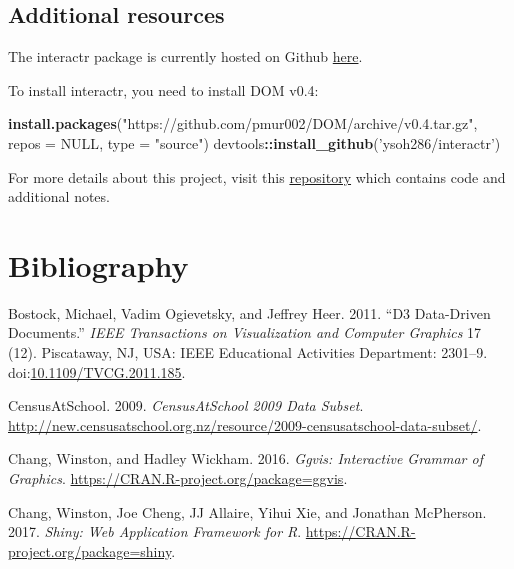 \documentclass[11pt,]{report}
\newenvironment{Shaded}{\begin{snugshade}}{\end{snugshade}}
\newcommand{\KeywordTok}[1]{\textcolor[rgb]{0.13,0.29,0.53}{\textbf{#1}}}
\newcommand{\DataTypeTok}[1]{\textcolor[rgb]{0.13,0.29,0.53}{#1}}
\newcommand{\StringTok}[1]{\textcolor[rgb]{0.31,0.60,0.02}{#1}}
\newcommand{\OtherTok}[1]{\textcolor[rgb]{0.56,0.35,0.01}{#1}}
\newcommand{\OperatorTok}[1]{\textcolor[rgb]{0.81,0.36,0.00}{\textbf{#1}}}
\newcommand{\NormalTok}[1]{#1}
\begin{document}
\section{Additional resources}\label{additional-resources}

The \textsf{interactr} package is currently hosted on Github
\href{https://github.com/ysoh286/interactr}{here}.

To install \textsf{interactr}, you need to install DOM v0.4:

\begin{Shaded}
\begin{Highlighting}[]
\KeywordTok{install.packages}\NormalTok{(}\StringTok{"https://github.com/pmur002/DOM/archive/v0.4.tar.gz"}\NormalTok{,}
                \DataTypeTok{repos =} \OtherTok{NULL}\NormalTok{, }\DataTypeTok{type =} \StringTok{"source"}\NormalTok{)}
\NormalTok{devtools}\OperatorTok{::}\KeywordTok{install_github}\NormalTok{(}\StringTok{'ysoh286/interactr'}\NormalTok{)}
\end{Highlighting}
\end{Shaded}

For more details about this project, visit this
\href{https://github.com/ysoh286/honours-project-2017}{repository} which
contains code and additional notes.

\newpage

\chapter*{Bibliography}\label{bibliography}

\hypertarget{refs}{}
\hypertarget{ref-bostock01}{}
Bostock, Michael, Vadim Ogievetsky, and Jeffrey Heer. 2011. ``D3
Data-Driven Documents.'' \emph{IEEE Transactions on Visualization and
Computer Graphics} 17 (12). Piscataway, NJ, USA: IEEE Educational
Activities Department: 2301--9.
doi:\href{https://doi.org/10.1109/TVCG.2011.185}{10.1109/TVCG.2011.185}.

\hypertarget{ref-census01}{}
CensusAtSchool. 2009. \emph{CensusAtSchool 2009 Data Subset}.
\url{http://new.censusatschool.org.nz/resource/2009-censusatschool-data-subset/}.

\hypertarget{ref-ggvis01}{}
Chang, Winston, and Hadley Wickham. 2016. \emph{Ggvis: Interactive
Grammar of Graphics}. \url{https://CRAN.R-project.org/package=ggvis}.

\hypertarget{ref-shiny01}{}
Chang, Winston, Joe Cheng, JJ Allaire, Yihui Xie, and Jonathan
McPherson. 2017. \emph{Shiny: Web Application Framework for R}.
\url{https://CRAN.R-project.org/package=shiny}.
\end{document}
